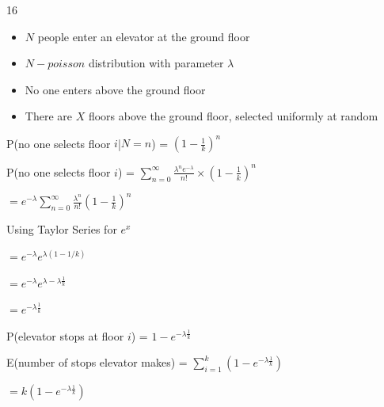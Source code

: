 \documentclass[12 pt]{article}
\begin{document}
    \begin{exercise}{16}
    \hfill

    \begin{itemize}
        \item $N$ people enter an elevator at the ground floor
        \item $N - poisson$ distribution with parameter $\lambda$
        \item No one enters above the ground floor
        \item There are $X$ floors above the ground floor, selected uniformly at random
    \end{itemize}

    \hfill

    P(no one selects floor $i$|$N=n$) = $(1 - \frac{1}{k})^n$

    P(no one selects floor $i$) = $\sum_{n=0}^{\infty} \frac{\lambda^n e^{-\lambda}}{n!} \times (1- \frac{1}{k})^n$

    $= e^{-\lambda} \sum_{n=0}^{\infty} \frac{\lambda^n}{n!}(1 - \frac{1}{k})^n$

    Using Taylor Series for $e^x$

    $= e^{-\lambda} e^{\lambda(1- 1/k)}$

    $= e^{-\lambda} e^{\lambda - \lambda \frac{1}{k}}$

    $= e^{-\lambda \frac{1}{k}}$

    \hfill

    P(elevator stops at floor $i$) = $1 - e^{-\lambda \frac{1}{k}}$

    E(number of stops elevator makes) = $\sum_{i=1}^k (1-e^{-\lambda \frac{1}{k}})$

    $= k (1 - e^{- \lambda \frac{1}{k}})$
        
    \end{exercise}
    
\end{document}
